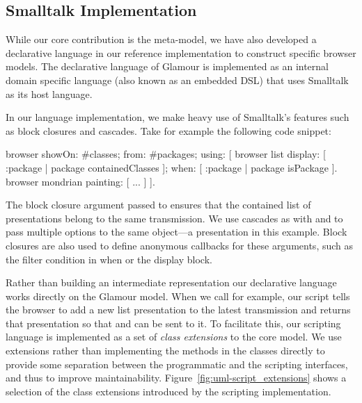\documentclass[a4paper,10pt,twoside]{book}
\begin{document}
\subsection{Smalltalk Implementation}
\label{sec:impl/smalltalk-implementation}

While our core contribution is the meta-model, we have also developed
a declarative language in our reference implementation to construct
specific browser models. The declarative language of Glamour is
implemented as an internal domain specific language (also known as an
embedded DSL) that uses Smalltalk as its host language.

In our language implementation, we make heavy use of Smalltalk's
features such as block closures and cascades. Take for example the
following code snippet:

\begin{code}{}
browser showOn: #classes; from: #packages; using: [
	browser list
		display: [ :package | package containedClasses ];
		when: [ :package | package isPackage ].
	browser mondrian painting: [ ... ]
].
\end{code}

The block closure argument passed to  ensures that the contained list of presentations belong to the same transmission. We use cascades as with  and  to pass multiple options to the same object---a presentation in this example. Block closures are also used to define anonymous callbacks for these arguments, such as the filter condition in when or the display block. 

Rather than building an intermediate representation our declarative language works directly on the Glamour model. When we call  for example, our script tells the browser to add a new list presentation to the latest transmission and returns that presentation so that  and  can be sent to it. To facilitate this, our scripting language is implemented as a set of \emph{class extensions} to the core model. We use extensions rather than implementing the methods in the classes directly to provide some separation between the programmatic and the scripting interfaces, and thus to improve maintainability. Figure~\ref{fig:uml-script_extensions} shows a selection of the class extensions introduced by the scripting implementation.
\end{document}
